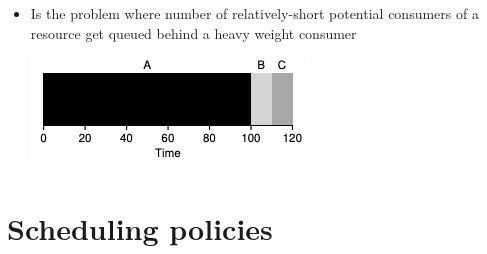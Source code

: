 \documentclass[12pt]{article}
\begin{document}
\begin{itemize}
    \item Is the problem where number of relatively-short potential consumers
    of a resource get queued behind a heavy weight consumer

    \bigskip

    \begin{center}
    \includegraphics[width=0.7\linewidth]{images/midterm_2_solution_5.png}
    \end{center}
\end{itemize}

\section{Scheduling policies}
\end{document}
